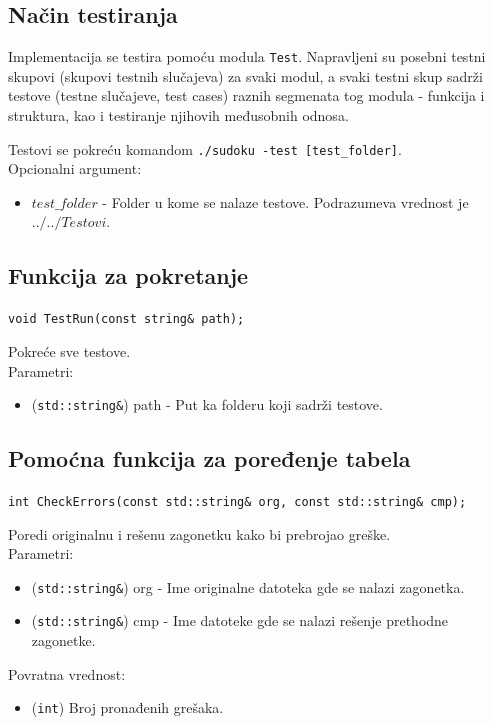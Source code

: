 \documentclass[a4paper]{article}
\begin{document}
    \subsection{Način testiranja}
    Implementacija se testira pomoću modula \texttt{Test}. Napravljeni su posebni testni skupovi (skupovi testnih slučajeva) za svaki modul, 
    a svaki testni skup sadrži testove (testne slučajeve, test cases) raznih segmenata tog modula - funkcija i struktura, kao i testiranje njihovih međusobnih odnosa.
    \par Testovi se pokreću komandom \texttt{./sudoku -test [test\_folder]}.\\
    Opcionalni argument:
    \begin{itemize}
        \item $test\_folder$ - Folder u kome se nalaze testove. Podrazumeva vrednost je $../../Testovi$.
    \end{itemize}
    \subsection{Funkcija za pokretanje}
    \texttt{void TestRun(const string\& path);}
    \par Pokreće sve testove.\\
    Parametri:
    \begin{itemize}
        \item (\texttt{std::string\&}) path - Put ka folderu koji sadrži testove.
    \end{itemize}
    \subsection{Pomoćna funkcija za poređenje tabela}
    {\parindent0pt
    \texttt{int CheckErrors(const std::string\& org, const std::string\& cmp);}
    }
    \par Poredi originalnu i rešenu zagonetku kako bi prebrojao greške.\\
    Parametri:
    \begin{itemize}
        \item (\texttt{std::string\&}) org - Ime originalne datoteka gde se nalazi zagonetka.
        \item (\texttt{std::string\&}) cmp - Ime datoteke gde se nalazi rešenje prethodne zagonetke.
    \end{itemize}
    Povratna vrednost:
    \begin{itemize}
        \item (\texttt{int}) Broj pronađenih grešaka.
    \end{itemize}
\end{document}
